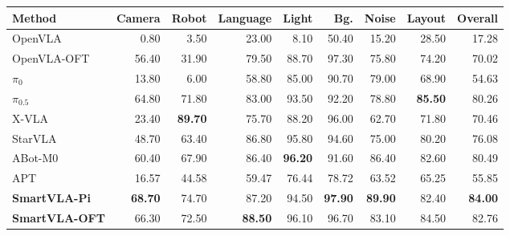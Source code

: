 \begin{center}
\begin{minipage}{\linewidth}
\centering
\setlength{\belowcaptionskip}{\baselineskip}
\label{tab:libero-plus}
\normalsize
\setlength{\tabcolsep}{4pt}
\renewcommand{\arraystretch}{1.10}
\begin{tabular}{@{}lrrrrrrrr@{}}
\toprule
Method & Camera & Robot & Language & Light & Bg. & Noise & Layout & Overall \\
\midrule
OpenVLA & 0.80 & 3.50 & 23.00 & 8.10 & 50.40 & 15.20 & 28.50 & 17.28 \\
OpenVLA-OFT & 56.40 & 31.90 & 79.50 & 88.70 & 97.30 & 75.80 & 74.20 & 70.02 \\
$\pi_{0}$ & 13.80 & 6.00 & 58.80 & 85.00 & 90.70 & 79.00 & 68.90 & 54.63 \\
$\pi_{0.5}$ & 64.80 & 71.80 & 83.00 & 93.50 & 92.20 & 78.80 & \textbf{85.50} & 80.26 \\
X-VLA & 23.40 & \textbf{89.70} & 75.70 & 88.20 & 96.00 & 62.70 & 71.80 & 70.46 \\
StarVLA & 48.70 & 63.40 & 86.80 & 95.80 & 94.60 & 75.00 & 80.20 & 76.08 \\
ABot-M0 & 60.40 & 67.90 & 86.40 & \textbf{96.20} & 91.60 & 86.40 & 82.60 & 80.49 \\
APT & 16.57 & 44.58 & 59.47 & 76.44 & 78.72 & 63.52 & 65.25 & 55.85 \\
\midrule
\rowcolor{smartvlarow}
\textbf{SmartVLA-Pi} & \textbf{68.70} & 74.70 & 87.20 & 94.50 & \textbf{97.90} & \textbf{89.90} & 82.40 & \textbf{84.00} \\
\rowcolor{smartvlarow}
\textbf{SmartVLA-OFT} & 66.30 & 72.50 & \textbf{88.50} & 96.10 & 96.70 & 83.10 & 84.50 & 82.76 \\
\bottomrule
\end{tabular}
\end{minipage}
\end{center}
